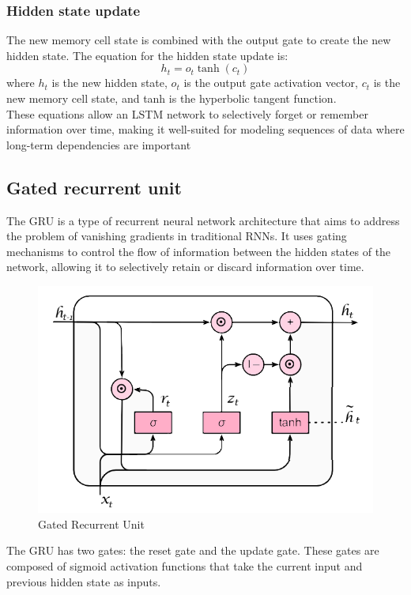 \documentclass[a4paper]{sapthesis}
\begin{document}
\subsubsection{Hidden state update}
The new memory cell state is combined with the output gate
 to create the new hidden state. The equation for the hidden state update is:
 \begin{equation}
  h_t = o_t \tanh(c_t)
  \end{equation}
where $h_t$ is the new hidden state, $o_t$ is the output gate activation vector,
 $c_t$ is the new memory cell state, and tanh is the hyperbolic tangent function.\newline \\
These equations allow an LSTM network to selectively forget or remember
 information over time, making it well-suited for modeling sequences of
  data where long-term dependencies are important
\subsection{Gated recurrent unit}
The GRU is a type of recurrent neural network architecture that aims to 
address the problem of vanishing gradients in traditional RNNs. It uses 
gating mechanisms to control the flow of information between the hidden 
states of the network, allowing it to selectively retain or discard 
information over time.\newline
\begin{figure}[h!]
  \includegraphics[scale=0.6]{gru}
  \centering
  \caption{Gated Recurrent Unit}\label{fig:gru}
  \end{figure}
The GRU has two gates: the reset gate and the update gate. These gates 
are composed of sigmoid activation functions that take the current 
input and previous hidden state as inputs. 
\end{document}
